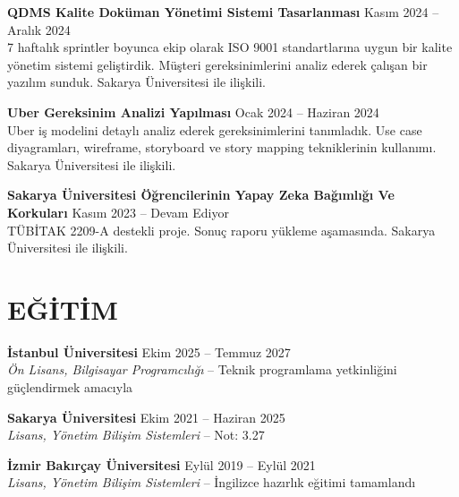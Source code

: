 \documentclass[a4paper,8pt]{article}
\begin{document}
\textbf{QDMS Kalite Doküman Yönetimi Sistemi Tasarlanması} \hfill {\small Kasım 2024 -- Aralık 2024}\\
{\small 7 haftalık sprintler boyunca ekip olarak ISO 9001 standartlarına uygun bir kalite yönetim sistemi geliştirdik. Müşteri gereksinimlerini analiz ederek çalışan bir yazılım sunduk. Sakarya Üniversitesi ile ilişkili.}

\vspace{3pt}

\textbf{Uber Gereksinim Analizi Yapılması} \hfill {\small Ocak 2024 -- Haziran 2024}\\
{\small Uber iş modelini detaylı analiz ederek gereksinimlerini tanımladık. Use case diyagramları, wireframe, storyboard ve story mapping tekniklerinin kullanımı. Sakarya Üniversitesi ile ilişkili.}

\vspace{3pt}

\textbf{Sakarya Üniversitesi Öğrencilerinin Yapay Zeka Bağımlığı Ve Korkuları} \hfill {\small Kasım 2023 -- Devam Ediyor}\\
{\small TÜBİTAK 2209-A destekli proje. Sonuç raporu yükleme aşamasında. Sakarya Üniversitesi ile ilişkili.}

\section{EĞİTİM}

\textbf{İstanbul Üniversitesi} \hfill {\small Ekim 2025 -- Temmuz 2027}\\
{\small \textit{Ön Lisans, Bilgisayar Programcılığı} -- Teknik programlama yetkinliğini güçlendirmek amacıyla}

\vspace{3pt}

\textbf{Sakarya Üniversitesi} \hfill {\small Ekim 2021 -- Haziran 2025}\\
{\small \textit{Lisans, Yönetim Bilişim Sistemleri} -- Not: 3.27}

\vspace{3pt}

\textbf{İzmir Bakırçay Üniversitesi} \hfill {\small Eylül 2019 -- Eylül 2021}\\
{\small \textit{Lisans, Yönetim Bilişim Sistemleri} -- İngilizce hazırlık eğitimi tamamlandı}

\end{document}
